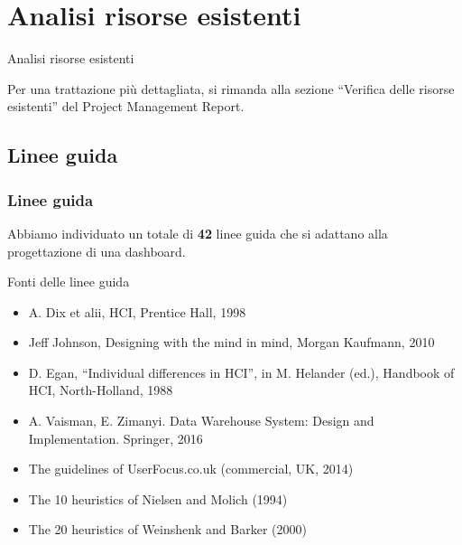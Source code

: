 \documentclass[handout]{beamer}
\begin{document}
	\section{Analisi risorse esistenti}
		\begin{frame}
			\centering
			\begin{Huge}
				Analisi risorse esistenti
			\end{Huge}
			\mbox{}
			\vfill
			\vspace*{100px}
			\begin{tiny}
				Per una trattazione più dettagliata, si rimanda alla sezione ``Verifica delle risorse esistenti'' del Project Management Report.
			\end{tiny}
		\end{frame}

		\subsection{Linee guida}

			\begin{frame}
	 			\frametitle{Linee guida}
				Abbiamo individuato un totale di \textbf{42} linee guida che si adattano alla progettazione di una dashboard.
				\begin{block}{Fonti delle linee guida}
					\begin{itemize}[<+->]
						\item A. Dix et alii, HCI, Prentice Hall, 1998\\
						\item Jeff Johnson, Designing with the mind in mind, Morgan Kaufmann, 2010\\
						\item D. Egan, “Individual differences in HCI”, in M. Helander (ed.), Handbook of HCI, North-Holland, 1988\\
						\item A. Vaisman, E. Zimanyi. Data Warehouse System: Design and Implementation. Springer, 2016\\
						\item The guidelines of UserFocus.co.uk (commercial, UK, 2014)\\
						\item The 10 heuristics of Nielsen and Molich (1994)\\
						\item The 20 heuristics of Weinshenk and Barker (2000)\\
					\end{itemize}
				\end{block}
			\end{frame}
		
\end{document}
